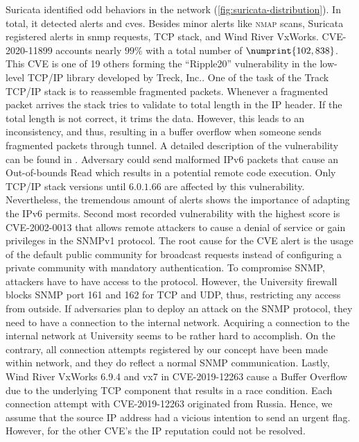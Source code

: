 Suricata identified odd behaviors in the network (\autoref{fig:suricata-distribution}).
In total, it detected  alerts and \acsp{cve}.
Besides minor alerts like \textsc{nmap} scans, Suricata registered alerts in \ac{snmp} requests, TCP stack, and Wind River VxWorks.
CVE-2020-11899 \cite{CVE-2020-11899} accounts nearly $99\%$ with a total number of $\numprint{102,838}$.
This CVE is one of 19 others forming the \enquote{Ripple20} vulnerability in the low-level TCP/IP library developed by Treck, Inc..
One of the task of the Track TCP/IP stack is to reassemble fragmented packets.
Whenever a fragmented packet arrives the stack tries to validate to total length in the IP header.
If the total length is not correct, it trims the data.
However, this leads to an inconsistency, and thus, resulting in a buffer overflow when someone sends fragmented packets through tunnel.
A detailed description of the vulnerability can be found in \cite{ripple20}.
Adversary could send malformed IPv6 packets that cause an Out-of-bounds Read which results in a potential remote code execution.
Only TCP/IP stack versions until $6.0.1.66$ are affected by this vulnerability.
Nevertheless, the tremendous amount of alerts shows the importance of adapting the IPv6 permits.
Second most recorded vulnerability with the highest score is CVE-2002-0013 \cite{CVE-2002-0013} that allows remote attackers to cause a denial of service or gain privileges in the SNMPv1 protocol.
The root cause for the CVE alert is the usage of the default public community for broadcast requests instead of configuring a private community with mandatory authentication.
To compromise SNMP, attackers have to have access to the protocol.
However, the University firewall blocks SNMP port 161 and 162 for TCP and UDP, thus, restricting any access from outside.
If adversaries plan to deploy an attack on the SNMP protocol, they need to have a connection to the internal network.
Acquiring a connection to the internal network at University seems to be rather hard to accomplish.
On the contrary, all connection attempts registered by our concept have been made within network, and they do reflect a normal SNMP communication.
Lastly, Wind River VxWorks 6.9.4 and vx7 in CVE-2019-12263 \cite{CVE-2019-12263} cause a Buffer Overflow due to the underlying TCP component that results in a race condition.
Each connection attempt with CVE-2019-12263 originated from Russia.
Hence, we assume that the source IP address had a vicious intention to send an urgent flag.
However, for the other CVE's the IP reputation could not be resolved.

